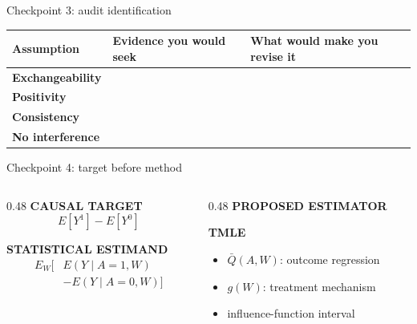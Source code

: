 \documentclass[aspectratio=169]{beamer}
\begin{document}
\begin{frame}{Checkpoint 3: audit identification}
  \small
  \begin{tabular}{>{\bfseries}p{}p{}p{}}
    Assumption & Evidence you would seek & What would make you revise it\\
    \midrule
    Exchangeability & & \\[0.67cm]
    Positivity & & \\[0.67cm]
    Consistency & & \\[0.67cm]
    No interference & & \\[0.67cm]
  \end{tabular}

  \vspace{0.2cm}
\end{frame}

\begin{frame}{Checkpoint 4: target before method}
  \begin{columns}[T,onlytextwidth]
    \begin{column}{0.48\textwidth}
      {\small\bfseries\color{navorange}CAUSAL TARGET}
      \[
        E[Y^{1}] - E[Y^{0}]
      \]

      {\small\bfseries\color{navorange}STATISTICAL ESTIMAND}
      {\small
      \[
        \begin{aligned}
        E_W\big[&E(Y\mid A=1,W)\\
                &-E(Y\mid A=0,W)\big]
        \end{aligned}
      \]}

    \end{column}
    \begin{column}{0.48\textwidth}
      {\small\bfseries\color{navorange}PROPOSED ESTIMATOR}

      \vspace{0.1cm}
      {\fontsize{30}{34}\selectfont\bfseries\color{resultgreen}TMLE}

      \begin{itemize}
        \item \(\bar Q(A,W)\): outcome regression
        \item \(g(W)\): treatment mechanism
        \item influence-function interval
      \end{itemize}

    \end{column}
  \end{columns}
\end{frame}
\end{document}
